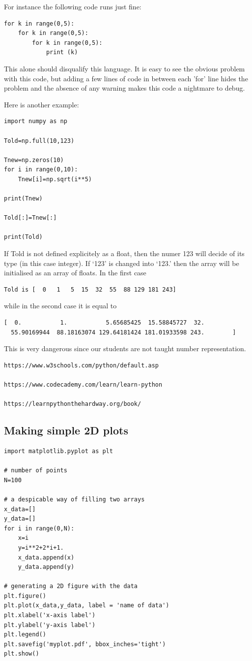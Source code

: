 For instance the following code runs just fine:

\begin{lstlisting}
for k in range(0,5): 
    for k in range(0,5):
        for k in range(0,5):
            print (k)
\end{lstlisting}

This alone should disqualify this language. It is easy to see the obvious problem with this code, but adding a few lines of code in between each 'for' line hides the problem and the absence of any warning makes this code a nightmare to debug.

Here is another example:

\begin{lstlisting}
import numpy as np

Told=np.full(10,123)

Tnew=np.zeros(10)
for i in range(0,10):
    Tnew[i]=np.sqrt(i**5)

print(Tnew)

Told[:]=Tnew[:]

print(Told)
\end{lstlisting}
If Told is not defined explicitely as a float, then the 
numer 123 will decide of its type (in this case 
integer). If `123' is changed into `123.' then the 
array will be initialised as an array of floats.
In the first case 
\begin{verbatim}
Told is [  0   1   5  15  32  55  88 129 181 243]
\end{verbatim}
while in the second case it is equal to 
\begin{verbatim}
[  0.           1.           5.65685425  15.58845727  32.
  55.90169944  88.18163074 129.64181424 181.01933598 243.        ] 
\end{verbatim}
This is very dangerous since our students are not taught 
number representation.

\begin{verbatim}
https://www.w3schools.com/python/default.asp

https://www.codecademy.com/learn/learn-python

https://learnpythonthehardway.org/book/
\end{verbatim}

\subsection{Making simple 2D plots}

\begin{lstlisting}
import matplotlib.pyplot as plt

# number of points
N=100

# a despicable way of filling two arrays
x_data=[]
y_data=[]
for i in range(0,N):
    x=i
    y=i**2+2*i+1.
    x_data.append(x)
    y_data.append(y)

# generating a 2D figure with the data
plt.figure()
plt.plot(x_data,y_data, label = 'name of data')
plt.xlabel('x-axis label')
plt.ylabel('y-axis label')
plt.legend()
plt.savefig('myplot.pdf', bbox_inches='tight')
plt.show()
\end{lstlisting}

